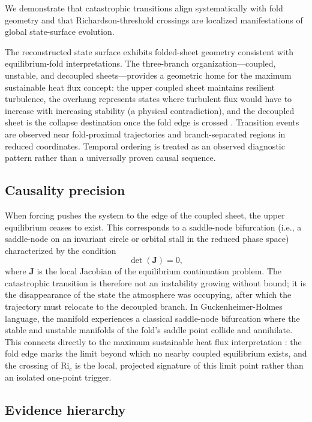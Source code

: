 \documentclass[12pt,a4paper]{article}
\newcommand{\Ric}{\mathrm{Ri}_c}
\newcommand{\mat}[1]{\mathbf{#1}}
\begin{document}
We demonstrate that catastrophic transitions align systematically with fold geometry and that Richardson-threshold crossings are localized manifestations of global state-surface evolution.

The reconstructed state surface exhibits folded-sheet geometry consistent with equilibrium-fold interpretations. The three-branch organization---coupled, unstable, and decoupled sheets---provides a geometric home for the maximum sustainable heat flux concept: the upper coupled sheet maintains resilient turbulence, the overhang represents states where turbulent flux would have to increase with increasing stability (a physical contradiction), and the decoupled sheet is the collapse destination once the fold edge is crossed \citep{vandewiel2017, mcnider1995}. Transition events are observed near fold-proximal trajectories and branch-separated regions in reduced coordinates. Temporal ordering is treated as an observed diagnostic pattern rather than a universally proven causal sequence.

\subsection{Causality precision}

When forcing pushes the system to the edge of the coupled sheet, the upper equilibrium ceases to exist. This corresponds to a saddle-node bifurcation (i.e., a saddle-node on an invariant circle or orbital stall in the reduced phase space) characterized by the condition
\begin{equation}
\det(\mat{J}) = 0,
\end{equation}
where $\mat{J}$ is the local Jacobian of the equilibrium continuation problem. The catastrophic transition is therefore not an instability growing without bound; it is the disappearance of the state the atmosphere was occupying, after which the trajectory must relocate to the decoupled branch. In Guckenheimer-Holmes language, the manifold experiences a classical saddle-node bifurcation where the stable and unstable manifolds of the fold's saddle point collide and annihilate. This connects directly to the maximum sustainable heat flux interpretation \citep{vandewiel2017}: the fold edge marks the limit beyond which no nearby coupled equilibrium exists, and the crossing of $\Ric$ is the local, projected signature of this limit point rather than an isolated one-point trigger.

\subsection{Evidence hierarchy}
\end{document}
